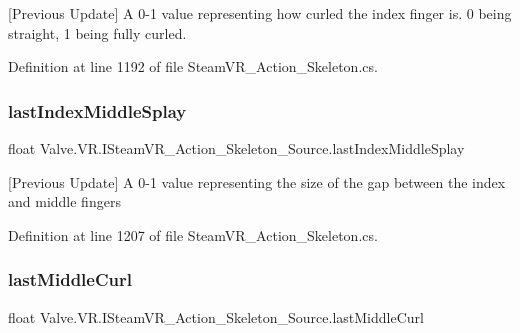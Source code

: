 \mbox{[}Previous Update\mbox{]} A 0-\/1 value representing how curled the index finger is. 0 being straight, 1 being fully curled. 



Definition at line 1192 of file Steam\+V\+R\+\_\+\+Action\+\_\+\+Skeleton.\+cs.

\mbox{\label{interface_valve_1_1_v_r_1_1_i_steam_v_r___action___skeleton___source_a5caec5585283ae9a0232ba0efe7b8e10}} 
\subsubsection{\texorpdfstring{lastIndexMiddleSplay}{lastIndexMiddleSplay}}
{\footnotesize\ttfamily float Valve.\+V\+R.\+I\+Steam\+V\+R\+\_\+\+Action\+\_\+\+Skeleton\+\_\+\+Source.\+last\+Index\+Middle\+Splay\hspace{0.3cm}{\ttfamily [get]}}



\mbox{[}Previous Update\mbox{]} A 0-\/1 value representing the size of the gap between the index and middle fingers 



Definition at line 1207 of file Steam\+V\+R\+\_\+\+Action\+\_\+\+Skeleton.\+cs.

\mbox{\label{interface_valve_1_1_v_r_1_1_i_steam_v_r___action___skeleton___source_a04d68434e94198e7b2f273a8183b66e0}} 
\subsubsection{\texorpdfstring{lastMiddleCurl}{lastMiddleCurl}}
{\footnotesize\ttfamily float Valve.\+V\+R.\+I\+Steam\+V\+R\+\_\+\+Action\+\_\+\+Skeleton\+\_\+\+Source.\+last\+Middle\+Curl\hspace{0.3cm}{\ttfamily [get]}}



